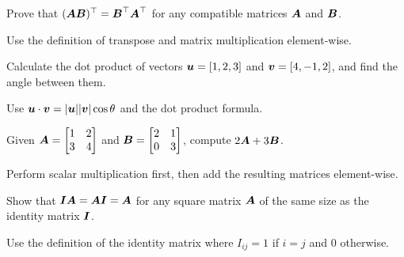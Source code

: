 \begin{exercisebox}[easy]
\begin{problem}
Prove that $(\boldsymbol{A}\boldsymbol{B})^\top = \boldsymbol{B}^\top\boldsymbol{A}^\top$ for any compatible matrices $\boldsymbol{A}$ and $\boldsymbol{B}$.
\end{problem}
\begin{hintbox}
Use the definition of transpose and matrix multiplication element-wise.
\end{hintbox}
\end{exercisebox}


\begin{exercisebox}[easy]
\begin{problem}
Calculate the dot product of vectors $\boldsymbol{u} = [1, 2, 3]$ and $\boldsymbol{v} = [4, -1, 2]$, and find the angle between them.
\end{problem}
\begin{hintbox}
Use $\boldsymbol{u} \cdot \boldsymbol{v} = |\boldsymbol{u}||\boldsymbol{v}|\cos\theta$ and the dot product formula.
\end{hintbox}
\end{exercisebox}


\begin{exercisebox}[easy]
\begin{problem}
Given $\boldsymbol{A} = \begin{bmatrix} 1 & 2 \\ 3 & 4 \end{bmatrix}$ and $\boldsymbol{B} = \begin{bmatrix} 2 & 1 \\ 0 & 3 \end{bmatrix}$, compute $2\boldsymbol{A} + 3\boldsymbol{B}$.
\end{problem}
\begin{hintbox}
Perform scalar multiplication first, then add the resulting matrices element-wise.
\end{hintbox}
\end{exercisebox}


\begin{exercisebox}[easy]
\begin{problem}
Show that $\boldsymbol{I}\boldsymbol{A} = \boldsymbol{A}\boldsymbol{I} = \boldsymbol{A}$ for any square matrix $\boldsymbol{A}$ of the same size as the identity matrix $\boldsymbol{I}$.
\end{problem}
\begin{hintbox}
Use the definition of the identity matrix where $I_{ij} = 1$ if $i = j$ and $0$ otherwise.
\end{hintbox}
\end{exercisebox}



